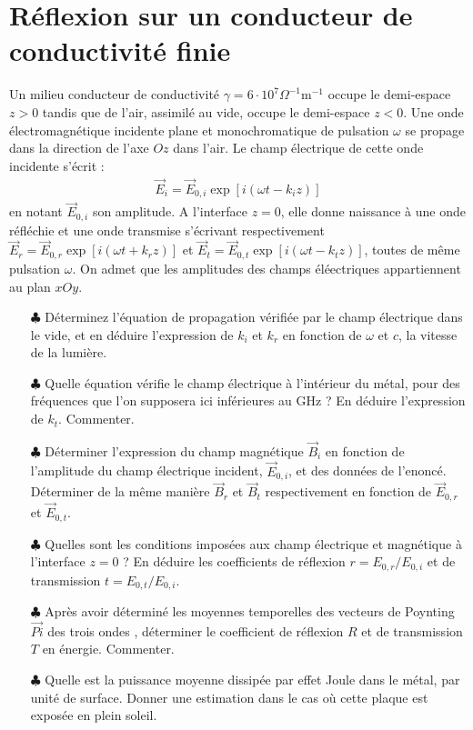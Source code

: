 \documentclass{report}
\begin{document}
\newpage

\section*{Réflexion sur un conducteur de conductivité finie}

Un milieu conducteur de conductivité $\gamma=6\cdot10^7\Omega^{-1}$m$^{-1}$ occupe le demi-espace $z>0$ tandis que de l'air, assimilé au vide, occupe le demi-espace $z<0$. Une onde électromagnétique incidente plane et monochromatique de pulsation $\omega$ se propage dans la direction de l'axe $Oz$ dans l'air. Le champ électrique de cette onde incidente s'écrit :
\begin{align*}
	\vec{E}_i=\vec{E}_{0,i}\exp[i(\omega t-k_iz)]
\end{align*}
en notant $\vec{E}_{0,i}$ son amplitude.
A l'interface $z=0$, elle donne naissance à une onde réfléchie et une onde transmise s'écrivant respectivement $\vec{E}_r=\vec{E}_{0,r}\exp[i(\omega t+k_rz)]$ et $\vec{E}_t=\vec{E}_{0,t}\exp[i(\omega t-k_tz)]$, toutes de même pulsation $\omega$. On admet que les amplitudes des champs éléectriques appartiennent au plan $xOy$.

\begin{itemize}
	
	\item[$\clubsuit$] Déterminez l'équation de propagation vérifiée par le champ électrique dans le vide, et en déduire l'expression de $k_i$ et $k_r$ en fonction de $\omega$ et $c$, la vitesse de la lumière. 
	
	\item[$\clubsuit$] Quelle équation vérifie le champ électrique à l'intérieur du métal, pour des fréquences que l'on supposera ici inférieures au GHz ? En déduire l'expression de $k_t$. Commenter. 
	
	\item[$\clubsuit$] Déterminer l'expression du champ magnétique $\vec{B}_i$ en fonction de l'amplitude du champ électrique incident, $\vec{E}_{0,i}$, et des données de l'enoncé. Déterminer de la même manière $\vec{B}_r$ et $\vec{B}_t$ respectivement en fonction de $\vec{E}_{0,r}$ et $\vec{E}_{0,t}$.
	
	\item[$\clubsuit$] Quelles sont les conditions imposées aux champ électrique et magnétique à l'interface $z=0$ ? En déduire les coefficients de réflexion $r=E_{0,r}/E_{0,i}$ et de transmission $t=E_{0,t}/E_{0,i}$.
	
	\item[$\clubsuit$] Après avoir déterminé les moyennes temporelles des vecteurs de Poynting $\vec{Pi}$ des trois ondes	, déterminer le coefficient de réflexion $R$ et de transmission $T$ en énergie. Commenter.
	
	\item[$\clubsuit$] Quelle est la puissance moyenne dissipée par effet Joule dans le métal, par unité de surface. Donner une estimation dans le cas où cette plaque est exposée en plein soleil.
	
\end{itemize}
\end{document}
